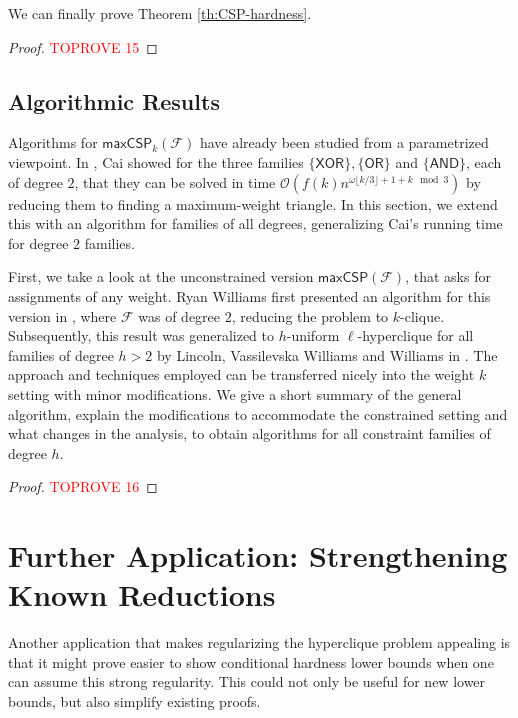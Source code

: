 \documentclass[a4paper,UKenglish,cleveref, autoref, thm-restate,numberwithinsect]{lipics-v2021}
\newcommand{\bigO}{\mathcal{O}}
\newcommand{\maxcspk}{\textsf{maxCSP}_{k}}
\newcommand{\maxcsp}{\textsf{maxCSP}}
\newcommand{\Fam}{\mathcal{F}}
\newcommand{\AND}{\textsf{AND}\xspace}
\newcommand{\xor}{\textsf{XOR}\xspace}
\newcommand{\OR}{\textsf{OR}\xspace}
\begin{document}
We can finally prove Theorem \ref{th:CSP-hardness}.
\begin{proof}\textcolor{red}{TOPROVE 15}\end{proof}

\subsection{Algorithmic Results}
Algorithms for $\maxcspk(\Fam)$ have already been studied from a parametrized viewpoint. In \cite{Cai08}, Cai showed for the three families $\{\xor\},\{\OR\}$ and $\{\AND\}$, each of degree $2$,
that they can be solved in time $\bigO(f(k) n^{\omega \lfloor k/3 \rfloor + 1 + k \mod 3})$ by reducing them to finding a maximum-weight triangle. 
In this section, we extend this with an algorithm for families of all degrees, generalizing Cai's running time for degree $2$ families.

First, we take a look at the unconstrained version $\maxcsp(\Fam)$, that asks for assignments of any weight.
Ryan Williams first presented an algorithm for this version in \cite{Wil07}, where $\Fam$ was of degree $2$, reducing the problem to $k$-clique.
Subsequently, this result was generalized to $h$-uniform $\ell$-hyperclique for all families of degree $h>2$ by Lincoln, {Vassilevska Williams} and Williams in \cite{LincolnWW18}.
The approach and techniques employed can be transferred nicely into the weight $k$ setting with minor modifications.
We give a short summary of the general algorithm, explain the modifications to accommodate the constrained setting and what changes in the analysis, 
to obtain algorithms for all constraint families of degree $h$.

\begin{proof}\textcolor{red}{TOPROVE 16}\end{proof}











\section{Further Application: Strengthening Known Reductions}
Another application that makes regularizing the hyperclique problem appealing is that
it might prove easier to show conditional hardness lower bounds when one can assume this strong regularity. 
This could not only be useful for new lower bounds, but also simplify existing proofs.
\end{document}
